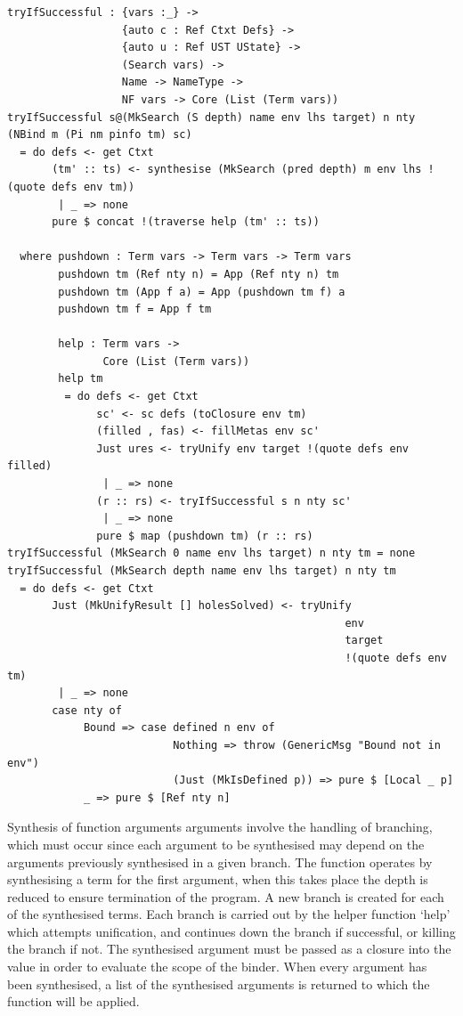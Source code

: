 \documentclass[a4paper]{article}
\begin{document}
\begin{center}
  \begin{verbatim}
tryIfSuccessful : {vars :_} ->
                  {auto c : Ref Ctxt Defs} ->
                  {auto u : Ref UST UState} ->
                  (Search vars) ->
                  Name -> NameType ->
                  NF vars -> Core (List (Term vars))
tryIfSuccessful s@(MkSearch (S depth) name env lhs target) n nty (NBind m (Pi nm pinfo tm) sc)
  = do defs <- get Ctxt
       (tm' :: ts) <- synthesise (MkSearch (pred depth) m env lhs !(quote defs env tm))
        | _ => none 
       pure $ concat !(traverse help (tm' :: ts))
       
  where pushdown : Term vars -> Term vars -> Term vars
        pushdown tm (Ref nty n) = App (Ref nty n) tm
        pushdown tm (App f a) = App (pushdown tm f) a
        pushdown tm f = App f tm
      
        help : Term vars ->
               Core (List (Term vars))
        help tm
         = do defs <- get Ctxt
              sc' <- sc defs (toClosure env tm)
              (filled , fas) <- fillMetas env sc'
              Just ures <- tryUnify env target !(quote defs env filled)
               | _ => none
              (r :: rs) <- tryIfSuccessful s n nty sc'
               | _ => none
              pure $ map (pushdown tm) (r :: rs)    
tryIfSuccessful (MkSearch 0 name env lhs target) n nty tm = none 
tryIfSuccessful (MkSearch depth name env lhs target) n nty tm 
  = do defs <- get Ctxt
       Just (MkUnifyResult [] holesSolved) <- tryUnify 
                                                     env 
                                                     target
                                                     !(quote defs env tm)
        | _ => none 
       case nty of
            Bound => case defined n env of
                          Nothing => throw (GenericMsg "Bound not in env")
                          (Just (MkIsDefined p)) => pure $ [Local _ p]
            _ => pure $ [Ref nty n]
  \end{verbatim}
\end{center}
       
Synthesis of function arguments arguments involve the handling of 
branching, which must occur since each argument to be synthesised may
depend on the arguments previously synthesised in a given branch.
The function operates by synthesising a term for the first argument, when
this takes place the depth is reduced to ensure termination of the
program. A new branch is created for each of the synthesised terms.
Each branch is carried out by the helper function `help' which attempts unification,
and continues down the branch if successful, or killing the branch if not. The synthesised argument
must be passed as a closure into the value in order to evaluate the scope of the binder.
When every argument has been synthesised, a list of the synthesised arguments is returned to which the
function will be applied.
\end{document}
